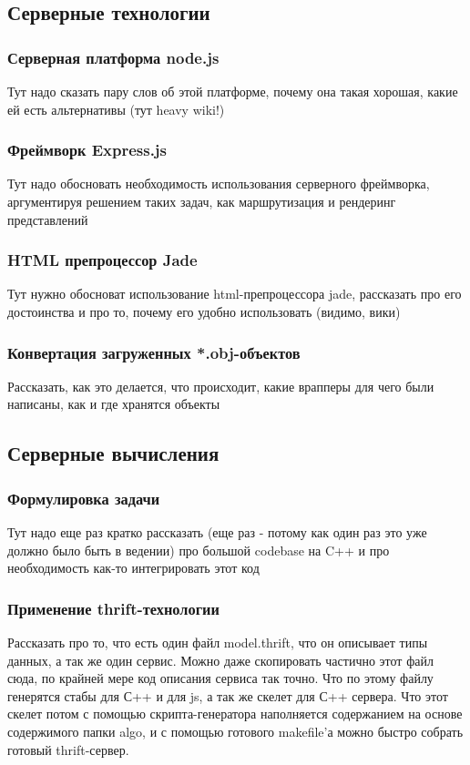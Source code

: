 \documentclass[12pt, a4paper]{article}
\begin{document}
\subsection{Серверные технологии}
\subsubsection{Серверная платформа node.js}
Тут надо сказать пару слов об этой платформе, почему она такая хорошая,
какие ей есть альтернативы (тут heavy wiki!)
\subsubsection{Фреймворк Express.js}
Тут надо обосновать необходимость использования серверного фреймворка,
аргументируя решением таких задач, как маршрутизация и рендеринг представлений
\subsubsection{HTML препроцессор Jade}
Тут нужно обосноват использование html-препроцессора jade, рассказать про его
достоинства и про то, почему его удобно использовать (видимо, вики)
\subsubsection{Конвертация загруженных *.obj-объектов}
Рассказать, как это делается, что происходит, какие врапперы для чего были
написаны, как и где хранятся объекты

\subsection{Серверные вычисления}
\subsubsection{Формулировка задачи}
Тут надо еще раз кратко рассказать (еще раз - потому как один раз это уже должно было
быть в ведении) про большой codebase на C++ и про необходимость как-то
интегрировать этот код
\subsubsection{Применение thrift-технологии}
Рассказать про то, что есть один файл model.thrift, что он описывает типы
данных, а так же один сервис. Можно даже скопировать частично этот файл сюда, по
крайней мере код описания сервиса так точно. Что по этому файлу генерятся стабы
для С++ и для js, а так же скелет для С++ сервера. Что этот скелет потом
с помощью скрипта-генератора наполняется содержанием на основе содержимого папки
algo, и с помощью готового makefile'а можно быстро собрать готовый
thrift-сервер.
\end{document}
